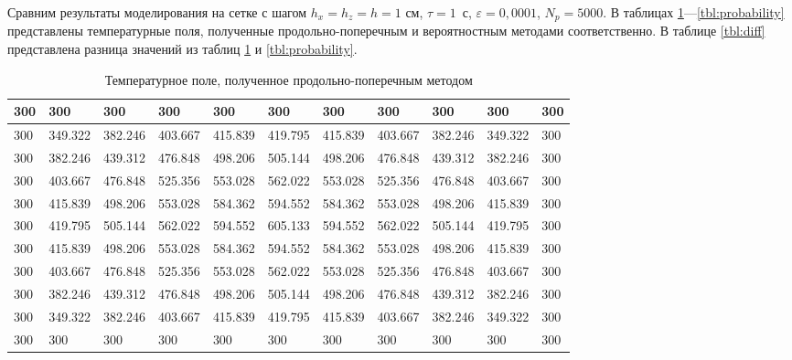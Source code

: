 \documentclass[12pt, a4paper]{article}
\begin{document}
Сравним результаты моделирования на сетке с шагом $h_x = h_z = h = 1$ см, $\tau = 1$~с, $\varepsilon = 0,0001$, $N_p = 5000$.
В таблицах \ref{tbl:adi}—\ref{tbl:probability} представлены температурные поля, полученные продольно-поперечным и вероятностным методами соответственно.
В таблице \ref{tbl:diff} представлена разница значений из таблиц \ref{tbl:adi} и \ref{tbl:probability}.

\begin{table}[ht]
	\small
	\caption{Температурное поле, полученное продольно-поперечным методом}
	\label{tbl:adi}
	\begin{tabular}{|l|l|l|l|l|l|l|l|l|l|l|}
		\hline
		300 & 300     & 300     & 300     & 300     & 300     & 300     & 300     & 300     & 300     & 300 \\ \hline
		300 & 349.322 & 382.246 & 403.667 & 415.839 & 419.795 & 415.839 & 403.667 & 382.246 & 349.322 & 300 \\ \hline
		300 & 382.246 & 439.312 & 476.848 & 498.206 & 505.144 & 498.206 & 476.848 & 439.312 & 382.246 & 300 \\ \hline
		300 & 403.667 & 476.848 & 525.356 & 553.028 & 562.022 & 553.028 & 525.356 & 476.848 & 403.667 & 300 \\ \hline
		300 & 415.839 & 498.206 & 553.028 & 584.362 & 594.552 & 584.362 & 553.028 & 498.206 & 415.839 & 300 \\ \hline
		300 & 419.795 & 505.144 & 562.022 & 594.552 & 605.133 & 594.552 & 562.022 & 505.144 & 419.795 & 300 \\ \hline
		300 & 415.839 & 498.206 & 553.028 & 584.362 & 594.552 & 584.362 & 553.028 & 498.206 & 415.839 & 300 \\ \hline
		300 & 403.667 & 476.848 & 525.356 & 553.028 & 562.022 & 553.028 & 525.356 & 476.848 & 403.667 & 300 \\ \hline
		300 & 382.246 & 439.312 & 476.848 & 498.206 & 505.144 & 498.206 & 476.848 & 439.312 & 382.246 & 300 \\ \hline
		300 & 349.322 & 382.246 & 403.667 & 415.839 & 419.795 & 415.839 & 403.667 & 382.246 & 349.322 & 300 \\ \hline
		300 & 300     & 300     & 300     & 300     & 300     & 300     & 300     & 300     & 300     & 300 \\ \hline
	\end{tabular}
\end{table}
\end{document}
